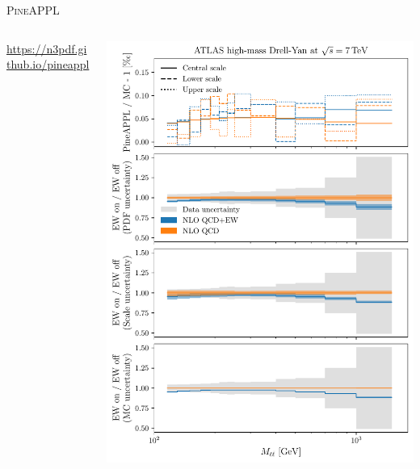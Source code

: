 \begin{frame}{\textrm{\textsc{PineAPPL}}}
\begin{columns}[T,onlytextwidth]
\begin{column}{.5\textwidth}
\url{https://n3pdf.github.io/pineappl}
\end{column}
\begin{column}{.5\textwidth}
\includegraphics[height=0.89\textheight]{ew_corrections/figures/pineappl_ATLASZHIGHMASS49FB}
\end{column}
\end{columns}
\end{frame}

